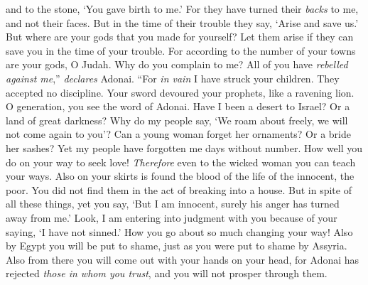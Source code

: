\begin{biblechapter}
and to the stone, ‘You gave birth to me.’ 
For they have turned their \textit{backs} to me, and not their faces. 
But in the time of their trouble they say, ‘Arise and save us.’
\verse But where are your gods that you made for yourself? 
Let them arise if they can save you in the time of your trouble. 
For according to the number of your towns 
are your gods, O Judah.
\verse Why do you complain to me? 
All of you have \textit{rebelled against me},” \textit{declares} Adonai.
\verse “For \textit{in vain} I have struck your children. 
They accepted no discipline. 
Your sword devoured your prophets, 
like a ravening lion.
\verse O generation, you see the word of Adonai. 
Have I been a desert to Israel? Or a land of great darkness? 
Why do my people say, ‘We roam about freely, 
we will not come again to you’?
\verse Can a young woman forget her ornaments? Or a bride her sashes? 
Yet my people have forgotten me days without number.
\verse How well you do on your way to seek love! 
\textit{Therefore} even to the wicked woman you can teach your ways.
\verse Also on your skirts is found 
the blood of the life of the innocent, the poor. 
You did not find them in the act of breaking into a house. 
But in spite of all these things,
\verse yet you say, ‘But I am innocent, 
surely his anger has turned away from me.’ 
Look, I am entering into judgment with you 
because of your saying, ‘I have not sinned.’
\verse How you go about so much changing your way! 
Also by Egypt you will be put to shame, 
just as you were put to shame by Assyria.
\verse Also from there you will come out 
with your hands on your head, 
for Adonai has rejected \textit{those in whom you trust}, 
and you will not prosper through them.
\end{biblechapter}


